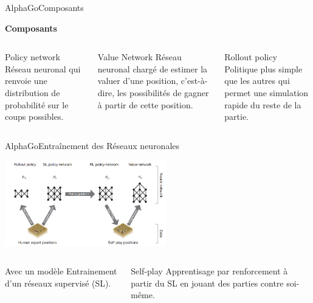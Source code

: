 \begin{frame}{AlphaGo}{Composants}
    \begin{center}
        \textbf{Composants}
    \end{center}
    \begin{columns}[t]
        \begin{column}{.3\textwidth}
            \begin{block}{Policy network}
                Réseau neuronal qui renvoie une distribution de probabilité sur le coups possibles.
            \end{block}
        \end{column}
        \begin{column}{.3\textwidth}
            \begin{block}{Value Network}
                Réseau neuronal chargé de estimer la valuer d'une position, c'est-à-dire, les possibilités de gagner à partir de cette position.
            \end{block}
        \end{column}
        \begin{column}{.3\textwidth}
            \begin{block}{Rollout policy}
                Politique plus simple que les autres qui permet une simulation rapide du reste de la partie.
            \end{block}
        \end{column}
    \end{columns}
\end{frame}

\begin{frame}{AlphaGo}{Entraînement des Réseaux neuronales}
    \begin{center}
        \includegraphics[width=7cm]{ressources/AlphaGo/Entrainement}
        \begin{columns}[t]
            \begin{column}{.4\textwidth}
                \begin{block}{Avec un modèle}
                    Entrainement d'un réseaux supervisé (SL).
                \end{block}
            \end{column}
            \begin{column}{.4\textwidth}
                \begin{block}{Self-play}
                    Apprentisage par renforcement à partir du SL en jouant des parties contre soi-même.
                \end{block}
            \end{column}
        \end{columns}

    \end{center}
\end{frame}


